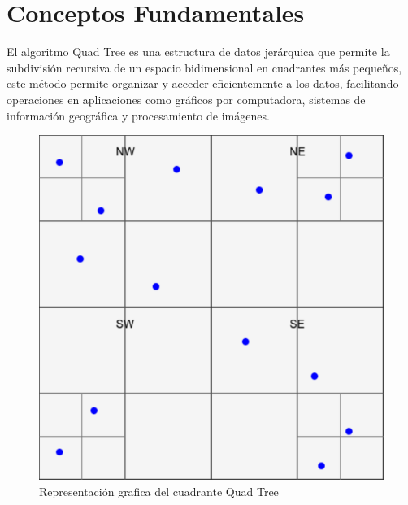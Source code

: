 \documentclass[9pt,a4paper,twoside]{rho-class/rho}
\begin{document}
    \section{ Conceptos Fundamentales }
    El algoritmo Quad Tree es una estructura de datos jerárquica que permite la subdivisión recursiva de un espacio bidimensional en cuadrantes más pequeños, este método permite organizar y acceder eficientemente a los datos, facilitando operaciones en aplicaciones como gráficos por computadora, sistemas de información geográfica y procesamiento de imágenes.
    \begin{figure}[h]
        \centering
        \includegraphics[width=\linewidth]{figures/quadtree.pdf}
        \caption{Representación grafica del cuadrante Quad Tree}
        \label{fig:representation_figure}
    \end{figure}\\
\end{document}
